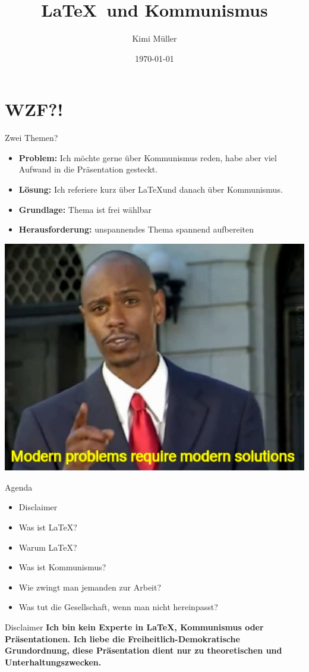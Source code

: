 \documentclass{beamer}
\title{\LaTeX \  und Kommunismus}
\date{\today}
\author{Kimi Müller}
\begin{document}
  \maketitle
  \section{WZF?!}
  \begin{frame}{Zwei Themen?}
    \begin{itemize}
        \item<1-> \textbf{Problem:} Ich möchte gerne über Kommunismus reden, habe aber viel Aufwand in die Präsentation gesteckt.
        \item<2-> \textbf{Lösung:} Ich referiere kurz über \LaTeX und danach über Kommunismus.
        \item<3-> \textbf{Grundlage:} Thema ist frei wählbar
        \item<4-> \textbf{Herausforderung:} unspannendes Thema spannend aufbereiten
    \end{itemize}
  \end{frame}
  \begin{frame}
    \includegraphics[width=\textwidth]{Modern_Problems_Require_Modern_Solutions.jpg}
  \end{frame}
  \begin{frame}{Agenda}
\begin{itemize}
    \item Disclaimer
    \item Was ist \LaTeX?
    \item Warum \LaTeX?
    \item Was ist Kommunismus?
    \item Wie zwingt man jemanden zur Arbeit?
    \item Was tut die Gesellschaft, wenn man nicht hereinpasst?
\end{itemize}
  \end{frame}
  \begin{frame}{Disclaimer}
\textbf{Ich bin kein Experte in \LaTeX, Kommunismus oder Präsentationen. Ich liebe die Freiheitlich-Demokratische Grundordnung, diese Präsentation dient nur zu theoretischen und Unterhaltungszwecken.}
\end{frame}
\end{document}
